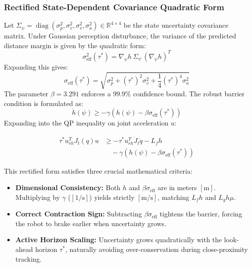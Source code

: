 \documentclass[10pt,twocolumn,a4paper]{article}
\begin{document}
\subsubsection{Rectified State-Dependent Covariance Quadratic Form}
Let $\Sigma_\psi = \operatorname{diag}(\sigma_p^2, \sigma_v^2, \sigma_v^2, \sigma_a^2) \in \mathbb{R}^{4 \times 4}$ be the state uncertainty covariance matrix. Under Gaussian perception disturbance, the variance of the predicted distance margin is given by the quadratic form:
\begin{equation}
\sigma_{\text{eff}}^2(\tau^*) = \nabla_\psi h \, \Sigma_\psi \, (\nabla_\psi h)^T
\end{equation}
Expanding this gives:
\begin{equation}
\sigma_{\text{eff}}(\tau^*) = \sqrt{\sigma_p^2 + (\tau^*)^2 \sigma_v^2 + \frac{1}{4}(\tau^*)^4 \sigma_a^2}
\end{equation}
The parameter $\beta = 3.291$ enforces a $99.9\%$ confidence bound. The robust barrier condition is formulated as:
\begin{equation}
\dot{h}(\psi) \ge -\gamma \left( h(\psi) - \beta \sigma_{\text{eff}}(\tau^*) \right)
\end{equation}
Expanding into the QP inequality on joint acceleration $u$:
\begin{tcolorbox}[title=\textbf{Rectified Robust CBF Constraint}]
\begin{equation}
\boxed{
\begin{aligned}
\tau^* u_{rh}^T J_t(q) u &\ge -\tau^* u_{rh}^T \dot{J}_t \dot{q} - L_f h \\
&\quad - \gamma \left( h(\psi) - \beta \sigma_{\text{eff}}(\tau^*) \right)
\end{aligned}
}
\end{equation}
\end{tcolorbox}
This rectified form satisfies three crucial mathematical criteria:
\begin{itemize}
    \item \textbf{Dimensional Consistency:} Both $h$ and $\beta \sigma_{\text{eff}}$ are in meters $[\text{m}]$. Multiplying by $\gamma$ ($[1/\text{s}]$) yields strictly $[\text{m/s}]$, matching $L_f h$ and $L_g h \mu$.
    \item \textbf{Correct Contraction Sign:} Subtracting $\beta \sigma_{\text{eff}}$ tightens the barrier, forcing the robot to brake earlier when uncertainty grows.
    \item \textbf{Active Horizon Scaling:} Uncertainty grows quadratically with the look-ahead horizon $\tau^*$, naturally avoiding over-conservatism during close-proximity tracking.
\end{itemize}
\end{document}
